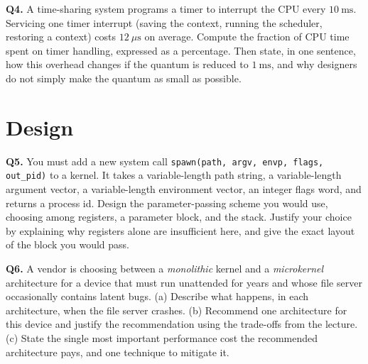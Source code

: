 \documentclass[11pt]{article}
\begin{document}
\textbf{Q4.} A time-sharing system programs a timer to interrupt the CPU every $10\ \text{ms}$. Servicing one timer interrupt (saving the context, running the scheduler, restoring a context) costs $12\ \mu\text{s}$ on average. Compute the fraction of CPU time spent on timer handling, expressed as a percentage. Then state, in one sentence, how this overhead changes if the quantum is reduced to $1\ \text{ms}$, and why designers do not simply make the quantum as small as possible.

\section{Design}

\textbf{Q5.} You must add a new system call \texttt{spawn(path, argv, envp, flags, out\_pid)} to a kernel. It takes a variable-length path string, a variable-length argument vector, a variable-length environment vector, an integer flags word, and returns a process id. Design the parameter-passing scheme you would use, choosing among registers, a parameter block, and the stack. Justify your choice by explaining why registers alone are insufficient here, and give the exact layout of the block you would pass.

\textbf{Q6.} A vendor is choosing between a \emph{monolithic} kernel and a \emph{microkernel} architecture for a device that must run unattended for years and whose file server occasionally contains latent bugs. (a) Describe what happens, in each architecture, when the file server crashes. (b) Recommend one architecture for this device and justify the recommendation using the trade-offs from the lecture. (c) State the single most important performance cost the recommended architecture pays, and one technique to mitigate it.
\end{document}
